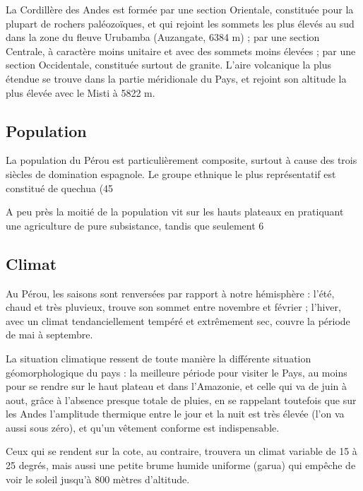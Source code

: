 \begin{multicols}{2}
La Cordillère des Andes est formée par une section Orientale, constituée pour la plupart de rochers paléozoïques, et qui rejoint les sommets les plus élevés au sud dans la zone du fleuve Urubamba (Auzangate, 6384 m) ; par une section Centrale, à caractère moins unitaire et avec des sommets moins élevées ; par une section Occidentale, constituée surtout de granite. L'aire volcanique la plus étendue se trouve dans la partie méridionale du Pays, et rejoint son altitude la plus élevée avec le Misti à 5822 m.

\subsection{Population}

La population du Pérou est particulièrement composite, surtout à cause des trois siècles de domination espagnole. Le groupe ethnique le plus représentatif est constitué de quechua (45%

A peu près la moitié de la population vit sur les hauts plateaux en pratiquant une agriculture de pure subsistance, tandis que seulement 6%

\subsection{Climat}

Au Pérou, les saisons sont renversées par rapport à notre hémisphère : l'été, chaud et très pluvieux, trouve son sommet entre novembre et février ; l'hiver, avec un climat tendanciellement tempéré et extrêmement sec, couvre la période de mai à septembre.

La situation climatique ressent de toute manière la différente situation géomorphologique du pays : la meilleure période pour visiter le Pays, au moins pour se rendre sur le haut plateau et dans l'Amazonie, et celle qui va de juin à aout, grâce à l'absence presque totale de pluies, en se rappelant toutefois que sur les Andes l'amplitude thermique entre le jour et la nuit est très élevée (l'on va aussi sous zéro), et qu'un vêtement conforme est indispensable.

Ceux qui se rendent sur la cote, au contraire, trouvera un climat variable de 15 à 25 degrés, mais aussi une petite brume humide uniforme (garua) qui empêche de voir le soleil jusqu'à 800 mètres d'altitude.


\end{multicols}

